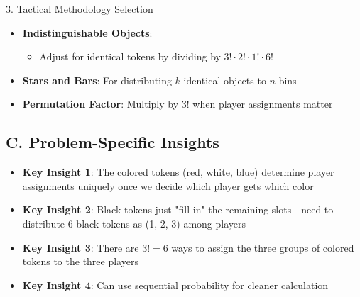\documentclass[12pt]{article}
\begin{document}
\begin{tacticsbox}{3. Tactical Methodology Selection}
\begin{itemize}[leftmargin=*]
    \item \textbf{Indistinguishable Objects}: 
    \begin{itemize}
        \item Adjust for identical tokens by dividing by $3! \cdot 2! \cdot 1! \cdot 6!$
    \end{itemize}
    
    \item \textbf{Stars and Bars}: For distributing $k$ identical objects to $n$ bins
    
    \item \textbf{Permutation Factor}: Multiply by $3!$ when player assignments matter
\end{itemize}

\subsection*{C. Problem-Specific Insights}
\begin{itemize}[leftmargin=*]
    \item \textbf{Key Insight 1}: The colored tokens (red, white, blue) determine player assignments uniquely once we decide which player gets which color
    
    \item \textbf{Key Insight 2}: Black tokens just "fill in" the remaining slots - need to distribute 6 black tokens as (1, 2, 3) among players
    
    \item \textbf{Key Insight 3}: There are $3! = 6$ ways to assign the three groups of colored tokens to the three players
    
    \item \textbf{Key Insight 4}: Can use sequential probability for cleaner calculation
\end{itemize}

\end{tacticsbox}
\end{document}

